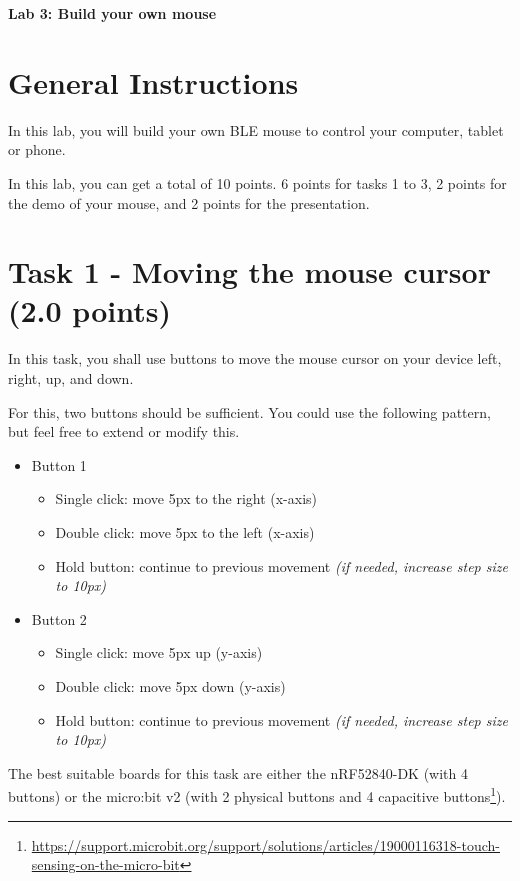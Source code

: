 \documentclass[11pt]{article}
\begin{document}
\begin{center}
{\Large \bf Lab 3: Build your own mouse }
\end{center}


\section*{General Instructions}

In this lab, you will build your own BLE mouse to control your computer, tablet or phone. 

In this lab, you can get a total of 10 points. 6 points for tasks 1 to 3, 2 points for the demo of your mouse, and 2 points for the presentation.



\section*{Task 1 - Moving the mouse cursor (2.0 points)}

In this task, you shall use buttons to move the mouse cursor on your device left, right, up, and down.

For this, two buttons should be sufficient. You could use the following pattern, but feel free to extend or modify this.

\begin{itemize}
    \item Button 1
    \begin{itemize}
        \item Single click: move 5px to the right (x-axis)
        \item Double click: move 5px to the left (x-axis)
        \item Hold button: continue to previous movement \textit{(if needed, increase step size to 10px)}
    \end{itemize}
    \item Button 2
    \begin{itemize}
        \item Single click: move 5px up (y-axis)
        \item Double click: move 5px down (y-axis)
        \item Hold button: continue to previous movement \textit{(if needed, increase step size to 10px)}
    \end{itemize}
\end{itemize}

The best suitable boards for this task are either the nRF52840-DK (with 4 buttons) or the micro:bit v2 (with 2 physical buttons and 4 capacitive buttons\footnote{\url{https://support.microbit.org/support/solutions/articles/19000116318-touch-sensing-on-the-micro-bit}}).
\end{document}
